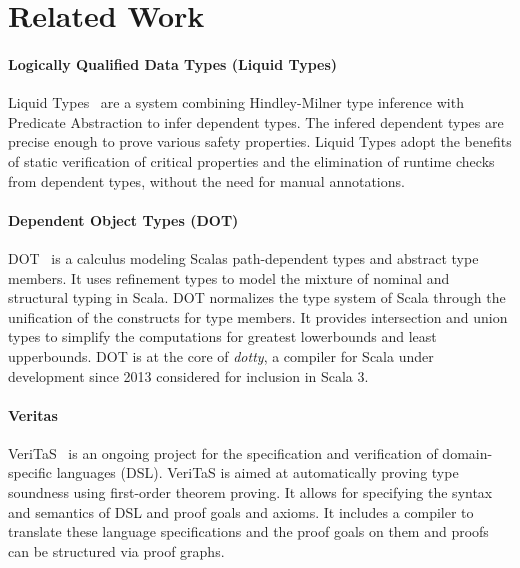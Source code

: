 \chapter{Related Work}
\label{chp:related}

\subsubsection{Logically Qualified Data Types (Liquid Types)}
Liquid Types~\cite{liquid-types} are a system
combining Hindley-Milner type inference with Predicate Abstraction
to infer dependent types.
The infered dependent types are precise enough
to prove various safety properties.
Liquid Types adopt the benefits of
static verification of critical properties and
the elimination of runtime checks
from dependent types,
without the need for manual annotations.


\subsubsection{Dependent Object Types (DOT)}
DOT~\cite{dot1,dot2} is a calculus
modeling Scalas path-dependent types and abstract type members.
It uses refinement types to model the mixture of
nominal and structural typing in Scala.
DOT normalizes the type system of Scala
through the unification of the constructs for type members.
It provides intersection and union types
to simplify the computations for greatest lowerbounds
and least upperbounds.
DOT is at the core of \textit{dotty},
a compiler for Scala under development since 2013
considered for inclusion in Scala 3.

\subsubsection{Veritas}
VeriTaS~\cite{veritas1,veritas2} is an ongoing project
for the specification and verification
of domain-specific languages (DSL).
VeriTaS is aimed at automatically proving type soundness 
using first-order theorem proving.
It allows for specifying
the syntax and semantics of DSL
and proof goals and axioms.
It includes a compiler to translate
these language specifications and the proof goals on them
and proofs can be structured via proof graphs.


